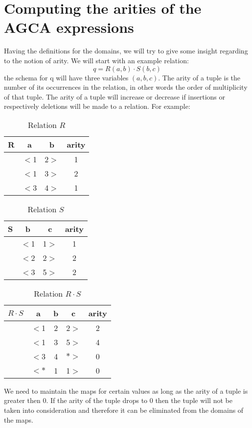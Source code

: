 \documentclass[12pt]{article}
\begin{document}
\section{Computing the arities of the AGCA expressions}
Having the definitions for the domains, we will try to give some insight regarding to the notion of arity. We will start with an example relation: $$q=R(a,b)\cdot S(b,c)$$ the schema for q will have three variables $(a,b,c)$. The arity of a tuple is the number of its occurrences in the relation, in other words the order of multiplicity of that tuple. The arity of a tuple will increase or decrease if insertions or respectively deletions will be made to a relation. For example:
\begin{table}[ht]
\centering
\begin{tabular}{c c c c}
	R & a & b & arity\\ [0.2ex]
	\hline
	  & $<$1 & 2$>$ & 1 \\
	  & $<$1 & 3$>$ & 2 \\
	  & $<$3 & 4$>$ & 1 \\
\end{tabular}
\caption{Relation $R$}
\end{table}
\begin{table}[ht]
\centering
\begin{tabular}{c c c c}
	S & b & c & arity\\ [0.2ex]
	\hline
	  & $<$1 & 1$>$ & 1 \\
	  & $<$2 & 2$>$ & 2 \\
	  & $<$3 & 5$>$ & 2 \\
\end{tabular}
\caption{Relation $S$}
\end{table}
\begin{table}[ht]
\centering
\begin{tabular}{c c c c c}
	$R\cdot S$ & a & b & c & arity\\ [0.2ex]
	\hline
	  & $<$1 & 2 & 2$>$ & 2 \\
	  & $<$1 & 3 & 5$>$ & 4 \\
	  & $<$3 & 4 & $*>$ & 0 \\
	  & $<*$ & 1 & 1$>$ & 0 \\
\end{tabular}
\caption{Relation $R\cdot S$}
\end{table}

We need to maintain the maps for certain values as long as the arity of a tuple is greater then 0. If the arity  of the tuple drops to 0 then the tuple will not be taken into consideration and therefore it can be eliminated from the domains of the maps.
\end{document}
